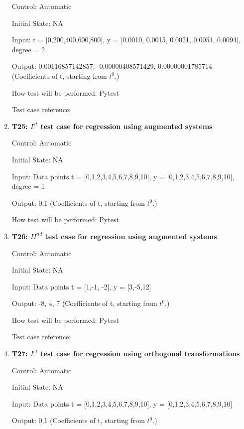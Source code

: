 \documentclass[12pt, titlepage]{article}
\begin{document}
\begin{enumerate}
Control: Automatic

Initial State: NA

Input: t = [0,200,400,600,800], y = [0.0010, 0.0015, 0.0021, 0.0051, 0.0094], degree = 2

Output: 0.00116857142857, -0.00000408571429, 0.00000001785714 (Coefficients of t, starting from $t^{0}$.)

How test will be performed: Pytest

Test case reference:~\cite{RegNormal}\\



\item{\textbf{T25: $I^{st}$ test case for regression using augmented systems}\\}

Control: Automatic

Initial State: NA

Input: Data points t = [0,1,2,3,4,5,6,7,8,9,10], y = [0,1,2,3,4,5,6,7,8,9,10], degree = 1 

Output: 0,1 (Coefficients of t, starting from $t^{0}$.)

How test will be performed: Pytest\\

\item{\textbf{T26: ${II}^{nd}$ test case for regression using augmented 
systems}\\}

Control: Automatic

Initial State: NA

Input: Data points t = [1,-1, -2], y = [3,-5,12] 

Output: -8, 4, 7 (Coefficients of t, starting from $t^{0}$.)

How test will be performed: Pytest

Test case reference: \cite{RegAugmented}\\


\item{\textbf{T27: ${I}^{st}$ test case for regression using orthogonal 
transformations}\\}

Control: Automatic

Initial State: NA

Input: Data points t = [0,1,2,3,4,5,6,7,8,9,10], y = [0,1,2,3,4,5,6,7,8,9,10] 

Output: 0,1 (Coefficients of t, starting from $t^{0}$.)


\end{enumerate}
\end{document}
